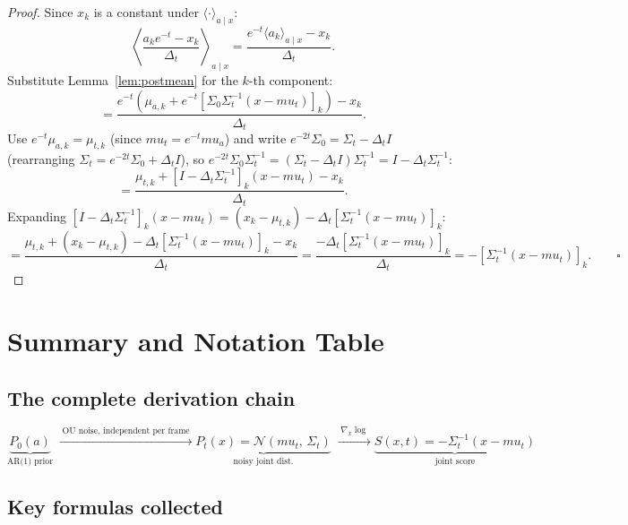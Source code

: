 \documentclass[12pt, a4paper]{article}
\def\ba{a}%
\def\bx{x}%
\def\bmu{mu}%
\def\bm#1{#1}%
\theoremstyle{definition}
\newcommand{\N}{\mathcal{N}}
\newcommand{\ba}{\bm{a}}
\newcommand{\bx}{\bm{x}}
\newcommand{\bmu}{\bm{\mu}}
\newcommand{\dt}{\Delta_t}
\begin{document}
\begin{proof}
Since $x_k$ is a constant under $\langle\cdot\rangle_{\ba\mid\bx}$:
\[
  \left\langle\frac{a_k e^{-t}-x_k}{\dt}\right\rangle_{\!\ba\mid\bx}
  = \frac{e^{-t}\langle a_k\rangle_{\ba\mid\bx} - x_k}{\dt}.
\]
Substitute Lemma~\ref{lem:postmean} for the $k$-th component:
\[
  = \frac{e^{-t}\!\left(\mu_{a,k} + e^{-t}[\Sigma_0\Sigma_t^{-1}(\bx-\bmu_t)]_k\right) - x_k}{\dt}.
\]
Use $e^{-t}\mu_{a,k} = \mu_{t,k}$ (since $\bmu_t = e^{-t}\bmu_a$) and write
$e^{-2t}\Sigma_0 = \Sigma_t - \dt I$ (rearranging $\Sigma_t = e^{-2t}\Sigma_0+\dt I$),
so $e^{-2t}\Sigma_0\Sigma_t^{-1} = (\Sigma_t-\dt I)\Sigma_t^{-1} = I - \dt\Sigma_t^{-1}$:
\[
  = \frac{\mu_{t,k} + [I - \dt\Sigma_t^{-1}]_k(\bx-\bmu_t) - x_k}{\dt}.
\]
Expanding $[I - \dt\Sigma_t^{-1}]_k(\bx-\bmu_t)
= (x_k - \mu_{t,k}) - \dt[\Sigma_t^{-1}(\bx-\bmu_t)]_k$:
\[
  = \frac{\mu_{t,k} + (x_k - \mu_{t,k}) - \dt[\Sigma_t^{-1}(\bx-\bmu_t)]_k - x_k}{\dt}
  = \frac{-\dt[\Sigma_t^{-1}(\bx-\bmu_t)]_k}{\dt}
  = -[\Sigma_t^{-1}(\bx-\bmu_t)]_k. \qquad\square
\]
\end{proof}

\section{Summary and Notation Table}

\subsection{The complete derivation chain}

\[
  \underbrace{P_0(\ba)}_{\text{AR(1) prior}}
  \;\xrightarrow{\;\text{OU noise, independent per frame}\;}
  \underbrace{P_t(\bx) = \N(\bmu_t,\,\Sigma_t)}_{\text{noisy joint dist.}}
  \;\xrightarrow{\;\nabla_{\bx} \log\;}
  \underbrace{\bm{S}(\bx,t) = -\Sigma_t^{-1}(\bx-\bmu_t)}_{\text{joint score}}
\]

\subsection{Key formulas collected}
\end{document}
